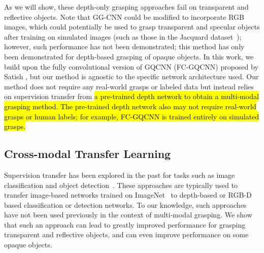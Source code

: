 As we will show, these depth-only grasping approaches fail on transparent and reflective objects. 
Note that GG-CNN could be modified to incorporate RGB images, which could potentially be used to grasp transparent and specular objects after training on simulated images (such as those in the Jacquard dataset~\cite{depierre2018jacquard}); however, such performance has not been demonstrated; this method has only been demonstrated for depth-based grasping of opaque objects.
In this work, we build upon the fully convolutional version of GQCNN (FC-GQCNN) proposed by Satish \etal\cite{satish2019policy}, but our method is agnostic to the specific network architecture used.
Our method does not require any real-world grasps or labeled data but instead relies on supervision transfer from \hl{a pre-trained depth network to obtain a multi-modal grasping method. The pre-trained depth network also may not require real-world grasps or human labels; for example, FC-GQCNN is trained entirely on simulated grasps.}

\subsection{Cross-modal Transfer Learning}
Supervision transfer has been explored in the past for tasks such as image classification and object detection~\cite{gupta2016cross, hoffman2016cross, li2018cross}.  These approaches are typically used to transfer image-based networks trained on ImageNet~\cite{deng2009imagenet} to depth-based or RGB-D based classification or detection networks.  To our knowledge, such approaches have not been used previously in the context of multi-modal grasping.  We show that such an approach can lead to greatly improved performance for grasping transparent and reflective objects, and can even improve performance on some opaque objects.
